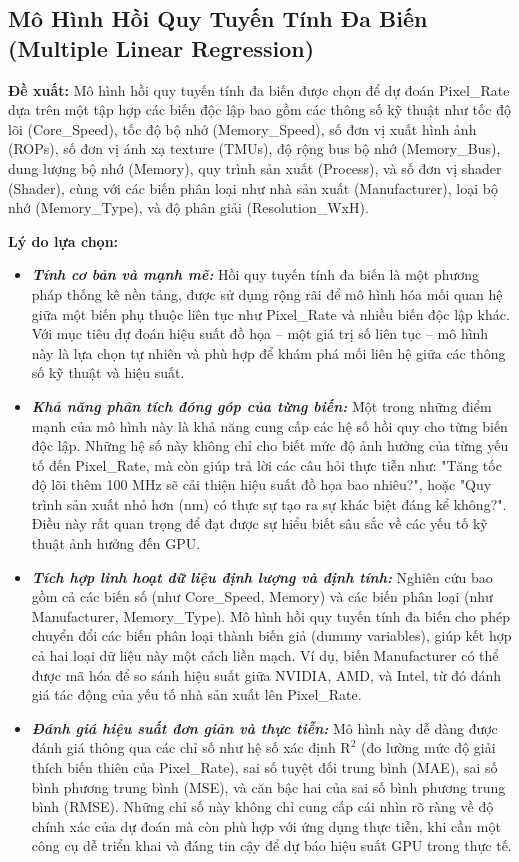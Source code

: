 \subsection{Mô Hình Hồi Quy Tuyến Tính Đa Biến (Multiple Linear Regression)}

\textbf{Đề xuất:} Mô hình hồi quy tuyến tính đa biến được chọn để dự đoán Pixel\_Rate dựa trên một tập hợp các biến độc lập bao gồm các thông số kỹ thuật như tốc độ lõi (Core\_Speed), tốc độ bộ nhớ (Memory\_Speed), số đơn vị xuất hình ảnh (ROPs), số đơn vị ánh xạ texture (TMUs), độ rộng bus bộ nhớ (Memory\_Bus), dung lượng bộ nhớ (Memory), quy trình sản xuất (Process), và số đơn vị shader (Shader), cùng với các biến phân loại như nhà sản xuất (Manufacturer), loại bộ nhớ (Memory\_Type), và độ phân giải (Resolution\_WxH).

\textbf{Lý do lựa chọn:}

\begin{itemize}
    \item \textit{\textbf{Tính cơ bản và mạnh mẽ:}} Hồi quy tuyến tính đa biến là một phương pháp thống kê nền tảng, được sử dụng rộng rãi để mô hình hóa mối quan hệ giữa một biến phụ thuộc liên tục như Pixel\_Rate và nhiều biến độc lập khác. Với mục tiêu dự đoán hiệu suất đồ họa – một giá trị số liên tục – mô hình này là lựa chọn tự nhiên và phù hợp để khám phá mối liên hệ giữa các thông số kỹ thuật và hiệu suất.
    \item \textit{\textbf{Khả năng phân tích đóng góp của từng biến:}} Một trong những điểm mạnh của mô hình này là khả năng cung cấp các hệ số hồi quy cho từng biến độc lập. Những hệ số này không chỉ cho biết mức độ ảnh hưởng của từng yếu tố đến Pixel\_Rate, mà còn giúp trả lời các câu hỏi thực tiễn như: "Tăng tốc độ lõi thêm 100 MHz sẽ cải thiện hiệu suất đồ họa bao nhiêu?", hoặc "Quy trình sản xuất nhỏ hơn (nm) có thực sự tạo ra sự khác biệt đáng kể không?". Điều này rất quan trọng để đạt được sự hiểu biết sâu sắc về các yếu tố kỹ thuật ảnh hưởng đến GPU.
    \item \textit{\textbf{Tích hợp linh hoạt dữ liệu định lượng và định tính:}} Nghiên cứu bao gồm cả các biến số (như Core\_Speed, Memory) và các biến phân loại (như Manufacturer, Memory\_Type). Mô hình hồi quy tuyến tính đa biến cho phép chuyển đổi các biến phân loại thành biến giả (dummy variables), giúp kết hợp cả hai loại dữ liệu này một cách liền mạch. Ví dụ, biến Manufacturer có thể được mã hóa để so sánh hiệu suất giữa NVIDIA, AMD, và Intel, từ đó đánh giá tác động của yếu tố nhà sản xuất lên Pixel\_Rate.
    \item \textit{\textbf{Đánh giá hiệu suất đơn giản và thực tiễn:}} Mô hình này dễ dàng được đánh giá thông qua các chỉ số như hệ số xác định $\text{R}^{\text{2}}$ (đo lường mức độ giải thích biến thiên của Pixel\_Rate), sai số tuyệt đối trung bình (MAE), sai số bình phương trung bình (MSE), và căn bậc hai của sai số bình phương trung bình (RMSE). Những chỉ số này không chỉ cung cấp cái nhìn rõ ràng về độ chính xác của dự đoán mà còn phù hợp với ứng dụng thực tiễn, khi cần một công cụ dễ triển khai và đáng tin cậy để dự báo hiệu suất GPU trong thực tế.
\end{itemize}


